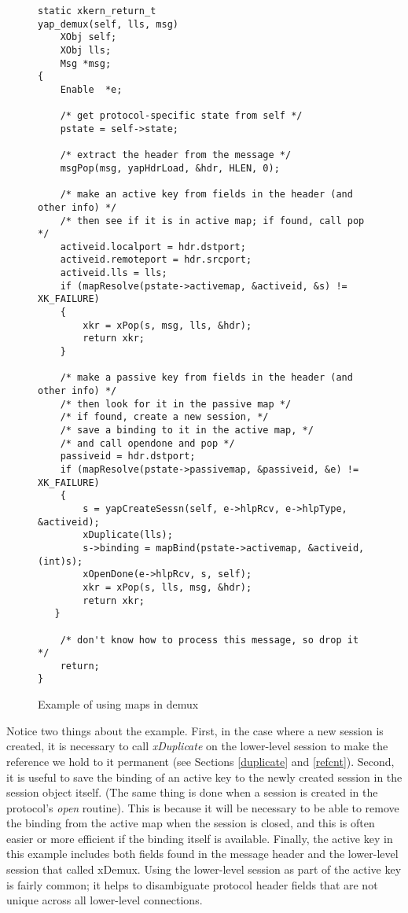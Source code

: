 \begin{figure}
\caption{Example of using maps in demux \label{fig:mapfig}}
\begin{verbatim}
static xkern_return_t
yap_demux(self, lls, msg)
    XObj self;
    XObj lls;
    Msg *msg;
{
    Enable  *e;
    
    /* get protocol-specific state from self */
    pstate = self->state;

    /* extract the header from the message */
    msgPop(msg, yapHdrLoad, &hdr, HLEN, 0);

    /* make an active key from fields in the header (and other info) */
    /* then see if it is in active map; if found, call pop */
    activeid.localport = hdr.dstport;
    activeid.remoteport = hdr.srcport;
    activeid.lls = lls;
    if (mapResolve(pstate->activemap, &activeid, &s) != XK_FAILURE)
    {  
        xkr = xPop(s, msg, lls, &hdr);
        return xkr;
    }

    /* make a passive key from fields in the header (and other info) */
    /* then look for it in the passive map */
    /* if found, create a new session, */
    /* save a binding to it in the active map, */
    /* and call opendone and pop */
    passiveid = hdr.dstport;
    if (mapResolve(pstate->passivemap, &passiveid, &e) != XK_FAILURE) 
    {
        s = yapCreateSessn(self, e->hlpRcv, e->hlpType, &activeid);
        xDuplicate(lls);
        s->binding = mapBind(pstate->activemap, &activeid, (int)s);
        xOpenDone(e->hlpRcv, s, self);
        xkr = xPop(s, lls, msg, &hdr);
        return xkr;
   }

    /* don't know how to process this message, so drop it */
    return;
}
\end{verbatim}
\end{figure}

Notice two things about the example. First, in the
case where a new session is created, it is necessary to call {\em
xDuplicate} on the lower-level session to make the reference we hold
to it permanent (see Sections \ref{duplicate} and \ref{refcnt}). 
Second, it is useful
to save the binding of an active key to the newly created session in
the session object itself. 
(The same thing is done when a session is created in the
protocol's {\em open} routine).
This is because it will be necessary to be able to remove the binding from the
active map when the session is closed, and this is often easier or
more efficient if the
binding itself is available.
Finally, the active key in this
example includes both fields found in the message header and the 
lower-level session that called xDemux. Using the lower-level session as
part of the active key is fairly common; it helps to disambiguate
protocol header fields that are not unique across all lower-level
connections.
